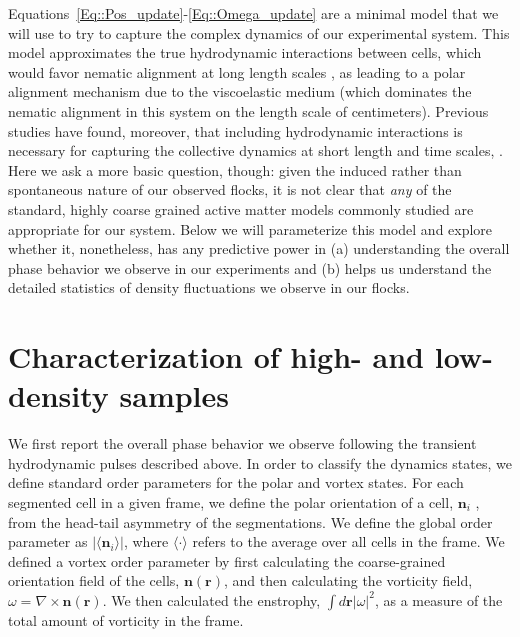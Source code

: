 \documentclass[reprint,unsortedaddress,amsmath,amssymb,aps,pre]{revtex4-2}
\begin{document}
Equations~\ref{Eq::Pos_update}-\ref{Eq::Omega_update} are a minimal model that we will use to try to capture the complex dynamics of our experimental system. This model approximates the true hydrodynamic interactions between cells, which would favor nematic alignment at long length scales \cite{Tung2015emergence}, as leading to a polar alignment mechanism due to the viscoelastic medium (which dominates the nematic alignment in this system on the length scale of centimeters\cite{tung2017fluid}). Previous studies have found, moreover, that including hydrodynamic interactions is necessary for capturing the collective dynamics at short length and time scales, \cite{riedel2005self,yang2014self}. Here we ask a more basic question, though: given the induced rather than spontaneous nature of our observed flocks, it is not clear that \emph{any} of the standard, highly coarse grained active matter models commonly studied are appropriate for our system. Below we will parameterize this model and explore whether it, nonetheless, has any predictive power in (a) understanding the overall phase behavior we observe in our experiments and (b) helps us understand the detailed statistics of density fluctuations we observe in our flocks. 


\section{Characterization of high- and low-density samples}
We first report the overall phase behavior we observe following the transient hydrodynamic pulses described above. In order to classify the dynamics states, we define standard order parameters for the polar and vortex states. For each segmented cell in a given frame, we define the polar orientation of a cell, $\mathbf{n}_{i}$ , from the head-tail asymmetry of the segmentations. We define the global order parameter as $|\langle\mathbf{n}_{i}\rangle|$, where $\langle\cdot\rangle$ refers to the average over all cells in the frame. We defined a vortex order parameter by first calculating the coarse-grained orientation field of the cells, $\mathbf{n}(\mathbf{r})$, and then calculating the vorticity field, $\omega=\nabla\times\mathbf{n}(\mathbf{r})$. We then calculated the enstrophy, $\int{d}\mathbf{r}|\omega|^2$, as a measure of the total amount of vorticity in the frame.
\end{document}
